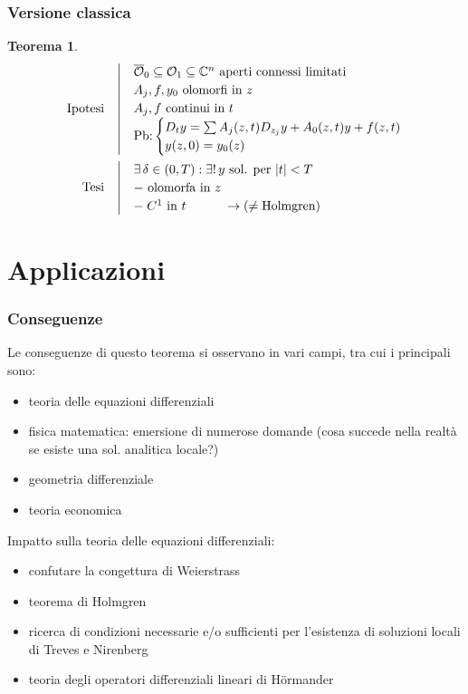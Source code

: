 \documentclass[serif,notheorems]{beamer}
\makeatletter
\newenvironment{ipotesi}%
{\quad\left|\quad\def\arraystretch{1.2}\begin{array}{@{}l@{}}}%
{\end{array}\right.}
\newcommand{\hpth}[2]
{
\begin{align*}
\quad
\text{Ipotesi}
&\begin{ipotesi}
#1
\end{ipotesi}\\
\text{Tesi}
&\begin{ipotesi}
#2
\end{ipotesi}
\end{align*}
}
\theoremstyle{definition} %
\newtheorem{theorem}{Teorema}[section] %
\theoremstyle{remark}
\makeatother
\begin{document}
\begin{frame}
\frametitle{Versione classica}
\begin{theorem}
\vspace{-5mm}
\hpth{
\overline{\mathcal{O}}_0 \subseteq \mathcal{O}_1 \subseteq \mathbb{C}^n \text{ aperti connessi limitati}\\
A_j, f, y_0 \text{ olomorfi in } z\\
A_j, f \text{ continui in } t\\
\text{Pb:}
\begin{cases}
D_t y = \sum A_j (z,t) D_{z_j}y+A_0(z,t)y +f(z,t) \\
y(z,0)=y_0(z)
\end{cases}\\
}{
\exists \, \delta \in (0,T) : \exists !\, y \text{ sol. per } |t|<T \\
- \text{ olomorfa in } z\\
- \; C^1 \text{ in } t \quad \quad \quad \rightarrow (\neq \text{Holmgren})
}
\end{theorem}
\end{frame}


\section{Applicazioni}

\begin{frame}
\frametitle{Conseguenze}
Le conseguenze di questo teorema si osservano in vari campi, tra cui i principali sono:
\begin{itemize}
\item teoria delle equazioni differenziali
\item fisica matematica: emersione di numerose domande (cosa succede nella realtà se esiste una sol. analitica locale?)
\item geometria differenziale
\item teoria economica
\end{itemize}
\end{frame}

\begin{frame}
Impatto sulla teoria delle equazioni differenziali:
\begin{itemize}
\item confutare la congettura di Weierstrass
\item teorema di Holmgren
\item ricerca di condizioni necessarie e/o sufficienti per l'esistenza di soluzioni locali di Treves e Nirenberg
\item teoria degli operatori differenziali lineari di Hörmander
\end{itemize}
\end{frame}
\end{document}
